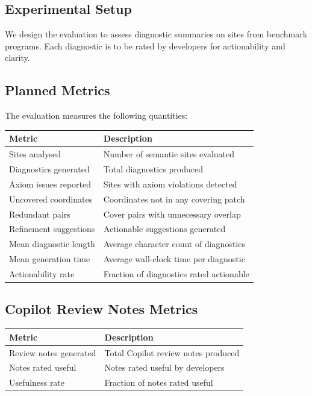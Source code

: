 \documentclass[11pt]{article}
\begin{document}
\subsection{Experimental Setup}

We design the evaluation to assess diagnostic summaries on sites from
benchmark programs.  Each diagnostic is to be rated by developers for
actionability and clarity.

\subsection{Planned Metrics}

The evaluation measures the following quantities:

\begin{center}
\begin{tabular}{lp{8cm}}
\toprule
\textbf{Metric} & \textbf{Description} \\
\midrule
Sites analysed            & Number of semantic sites evaluated \\
Diagnostics generated     & Total diagnostics produced \\
Axiom issues reported     & Sites with axiom violations detected \\
Uncovered coordinates     & Coordinates not in any covering patch \\
Redundant pairs           & Cover pairs with unnecessary overlap \\
Refinement suggestions    & Actionable suggestions generated \\
Mean diagnostic length    & Average character count of diagnostics \\
Mean generation time      & Average wall-clock time per diagnostic \\
Actionability rate        & Fraction of diagnostics rated actionable \\
\bottomrule
\end{tabular}
\end{center}

\subsection{Copilot Review Notes Metrics}

\begin{center}
\begin{tabular}{lp{8cm}}
\toprule
\textbf{Metric} & \textbf{Description} \\
\midrule
Review notes generated & Total Copilot review notes produced \\
Notes rated useful     & Notes rated useful by developers \\
Usefulness rate        & Fraction of notes rated useful \\
\bottomrule
\end{tabular}
\end{center}
\end{document}

